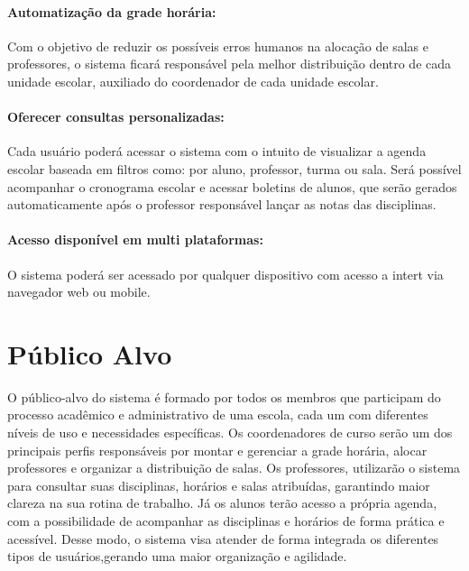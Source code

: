\documentclass[12pt,a4paper]{report}
\begin{document}
	\paragraph{Automatização da grade horária:}Com o objetivo de reduzir os possíveis erros humanos na alocação de salas e professores, o sistema ficará responsável pela melhor distribuição dentro de cada unidade escolar, auxiliado do coordenador de cada unidade escolar.
	\paragraph{Oferecer consultas personalizadas:} Cada usuário poderá acessar o sistema com o intuito de visualizar a agenda escolar baseada em filtros como: por aluno, professor, turma ou sala. Será possível acompanhar o cronograma escolar e acessar boletins de alunos, que serão gerados automaticamente após o professor responsável lançar as notas das disciplinas.
	\paragraph{Acesso disponível em multi plataformas:} O sistema poderá ser acessado por qualquer dispositivo com acesso a intert via navegador web ou mobile.


 
\section{Público Alvo}
O público-alvo do sistema é formado por todos os membros que participam do processo acadêmico e administrativo de uma escola, cada um com diferentes níveis de uso e necessidades específicas. Os coordenadores de curso serão um dos principais perfis responsáveis por montar e gerenciar a grade horária, alocar professores e organizar a distribuição de salas. Os professores, utilizarão o sistema para consultar suas disciplinas, horários e salas atribuídas, garantindo maior clareza na sua rotina de trabalho. Já os alunos terão acesso a própria agenda, com a possibilidade de acompanhar as disciplinas e horários de forma prática e acessível. Desse modo, o sistema visa atender de forma integrada os diferentes tipos de usuários,gerando uma maior organização e agilidade.
\end{document}
